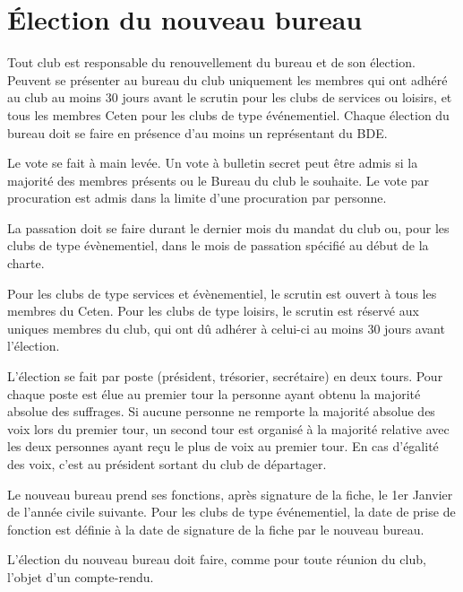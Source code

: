 \documentclass{article}
\begin{document}
\begin{multicols}{2}
{		}

		\section{Élection du nouveau bureau}
\label{sec:election_du_nouveau_bureau}

		{\small

			Tout club est responsable du renouvellement du bureau et de son
			élection. Peuvent se présenter au bureau du club uniquement les
			membres qui ont adhéré au club au moins 30 jours avant le scrutin
			pour les clubs de services ou loisirs, et tous les membres Ceten
			pour les clubs de type événementiel. Chaque élection du bureau doit
			se faire en présence d’au moins un représentant du BDE\@.

			Le vote se fait à main levée. Un vote à bulletin secret peut être
			admis si la majorité des membres présents ou le Bureau du club le
			souhaite. Le vote par procuration est admis dans la limite d’une
			procuration par personne.

			La passation doit se faire durant le dernier mois du mandat du club
			ou, pour les clubs de type évènementiel, dans le mois de passation
			spécifié au début de la charte.

			Pour les clubs de type services et évènementiel, le scrutin est
			ouvert à tous les membres du Ceten. Pour les clubs de type loisirs,
			le scrutin est réservé aux uniques membres du club, qui ont dû
			adhérer à celui-ci au moins 30 jours avant l’élection.

			L’élection se fait par poste (président, trésorier, secrétaire) en
			deux tours. Pour chaque poste est élue au premier tour la personne
			ayant obtenu la majorité absolue des suffrages. Si aucune personne
			ne remporte la majorité absolue des voix lors du premier tour, un
			second tour est organisé à la majorité relative avec les deux
			personnes ayant reçu le plus de voix au premier tour. En cas
			d’égalité des voix, c’est au président sortant du club de
			départager.

			Le nouveau bureau prend ses fonctions, après signature de la fiche,
			le 1er Janvier de l’année civile suivante. Pour les clubs de type
			événementiel, la date de prise de fonction est définie à la date de
			signature de la fiche par le nouveau bureau.

			L’élection du nouveau bureau doit faire, comme pour toute réunion du
			club, l’objet d’un compte-rendu.

		}


\end{multicols}
\end{document}

